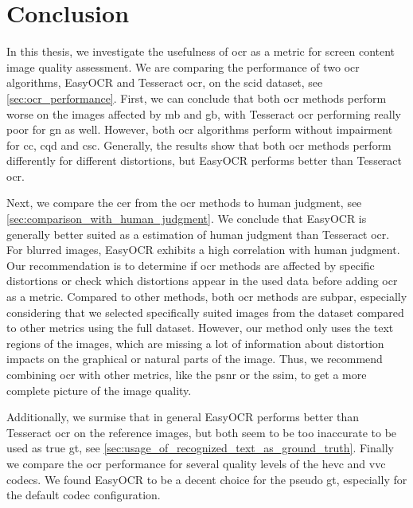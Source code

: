 \chapter{Conclusion}
\label{chap:conclusion}

In this thesis, we investigate the usefulness of \gls{ocr} as a metric for screen content image quality assessment.
We are comparing the performance of two \gls{ocr} algorithms, EasyOCR and Tesseract \gls{ocr}, on the \gls{scid} dataset, see \autoref{sec:ocr_performance}.
First, we can conclude that both \gls{ocr} methods perform worse on the images affected by \gls{mb} and \gls{gb}, with Tesseract \gls{ocr} performing really poor for \gls{gn} as well.
However, both \gls{ocr} algorithms perform without impairment for \gls{cc}, \gls{cqd} and \gls{csc}.
Generally, the results show that both \gls{ocr} methods perform differently for different distortions, but EasyOCR performs better than Tesseract \gls{ocr}.


Next, we compare the \gls{cer} from the \gls{ocr} methods to human judgment, see \autoref{sec:comparison_with_human_judgment}.
We conclude that EasyOCR is generally better suited as a estimation of human judgment than Tesseract \gls{ocr}.
For blurred images, EasyOCR exhibits a high correlation with human judgment.
Our recommendation is to determine if \gls{ocr} methods are affected by specific distortions or check which distortions appear in the used data before adding \gls{ocr} as a metric.
Compared to other methods, both \gls{ocr} methods are subpar, especially considering that we selected specifically suited images from the dataset compared to other metrics using the full dataset.
However, our method only uses the text regions of the images, which are missing a lot of information about distortion impacts on the graphical or natural parts of the image.
Thus, we recommend combining \gls{ocr} with other metrics, like the \gls{psnr} or the \gls{ssim}, to get a more complete picture of the image quality.

Additionally, we surmise that in general EasyOCR performs better than Tesseract \gls{ocr} on the reference images, but both seem to be too inaccurate to be used as true \gls{gt}, see \autoref{sec:usage_of_recognized_text_as_ground_truth}.
Finally we compare the \gls{ocr} performance for several quality levels of the \gls{hevc} and \gls{vvc} codecs.
We found EasyOCR to be a decent choice for the pseudo \gls{gt}, especially for the default codec configuration.


